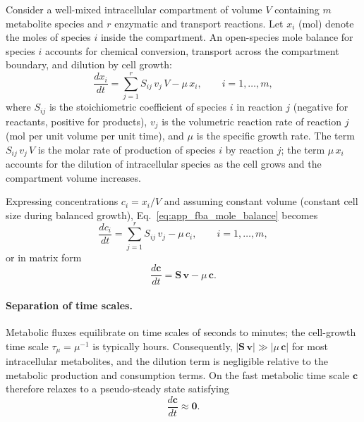 Consider a well-mixed intracellular compartment of volume $V$ containing
$m$ metabolite species and $r$ enzymatic and transport reactions.
Let $x_i$ (mol) denote the moles of species $i$ inside the compartment.
An open-species mole balance for species $i$ accounts for chemical
conversion, transport across the compartment boundary, and dilution by
cell growth:
\begin{equation}\label{eq:app_fba_mole_balance}
  \frac{dx_i}{dt}
    = \sum_{j=1}^{r} S_{ij}\,v_j\,V
      - \mu\,x_i,
      \qquad i = 1, \ldots, m,
\end{equation}
where $S_{ij}$ is the stoichiometric coefficient of species $i$ in reaction $j$
(negative for reactants, positive for products), $v_j$ is the volumetric
reaction rate of reaction $j$ (mol per unit volume per unit time), and $\mu$
is the specific growth rate.  The term $S_{ij}\,v_j\,V$ is the molar rate of
production of species $i$ by reaction $j$; the term $\mu\,x_i$ accounts for the
dilution of intracellular species as the cell grows and the compartment volume
increases.

Expressing concentrations $c_i = x_i / V$ and assuming constant volume
(constant cell size during balanced growth), Eq.~\eqref{eq:app_fba_mole_balance}
becomes
\begin{equation}\label{eq:app_fba_conc}
  \frac{dc_i}{dt}
    = \sum_{j=1}^{r} S_{ij}\,v_j - \mu\,c_i,
    \qquad i = 1, \ldots, m,
\end{equation}
or in matrix form
\begin{equation}\label{eq:app_fba_matrix}
  \frac{d\mathbf{c}}{dt} = \mathbf{S}\,\mathbf{v} - \mu\,\mathbf{c}.
\end{equation}

\paragraph{Separation of time scales.}
Metabolic fluxes equilibrate on time scales of seconds to minutes; the
cell-growth time scale $\tau_\mu = \mu^{-1}$ is typically hours.  Consequently,
$|\mathbf{S}\,\mathbf{v}| \gg |\mu\,\mathbf{c}|$ for most intracellular
metabolites, and the dilution term is negligible relative to the metabolic
production and consumption terms.  On the fast metabolic time scale
$\mathbf{c}$ therefore relaxes to a pseudo-steady state satisfying
\begin{equation}\label{eq:app_fba_pss}
  \frac{d\mathbf{c}}{dt} \approx \mathbf{0}.
\end{equation}

